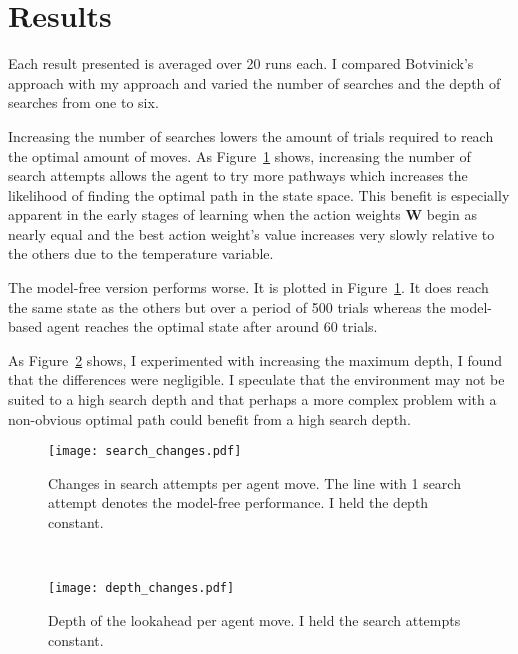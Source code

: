 \section{Results}
Each result presented is averaged over 20 runs each. I compared Botvinick's approach with my approach and varied the number of searches and the depth of searches from one to six.

Increasing the number of searches lowers the amount of trials required to reach the optimal amount of moves. As Figure~\ref{fig:search_changes} shows, increasing the number of search attempts allows the agent to try more pathways which increases the likelihood of finding the optimal path in the state space. This benefit is especially apparent in the early stages of learning when the action weights \textbf{W} begin as nearly equal and the best action weight's value increases very slowly relative to the others due to the temperature variable.

The model-free version performs worse. It is plotted in Figure~\ref{fig:search_changes}. It does reach the same state as the others but over a period of 500 trials whereas the model-based agent reaches the optimal state after around 60 trials.

As Figure~\ref{fig:depth_changes} shows, I experimented with increasing the maximum depth, I found that the differences were negligible. I speculate that the environment may not be suited to a high search depth and that perhaps a more complex problem with a non-obvious optimal path could benefit from a high search depth.


\begin{figure*}[h]
    \centering
    \begin{subfigure}[h]{0.49\textwidth}
        \centering
        \texttt{[image: search\_changes.pdf]}
        \caption{Changes in search attempts per agent move. The line with 1 search attempt denotes the model-free performance. I held the depth constant.}
		\label{fig:search_changes}
    \end{subfigure}%
    ~ 
    \begin{subfigure}[h]{0.49\textwidth}
        \centering
        \texttt{[image: depth\_changes.pdf]}
        \caption{Depth of the lookahead per agent move. I held the search attempts constant.}
		\label{fig:depth_changes}
    \end{subfigure}
    \caption{Results from my experiments with model based HRL. The first figure shows that that the more search attempts improves the model. I also show that the amount of depth impacting the model is difficult to ascertain.}
\end{figure*}

